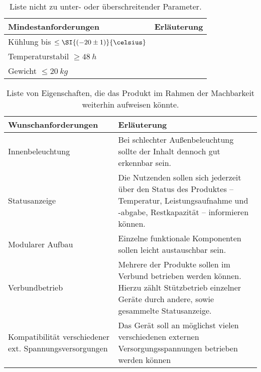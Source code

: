 		\newpage
		\begin{table}[h]
			\centering
			\caption{Liste nicht zu unter- oder überschreitender Parameter.}
			\begin{tabular}{@{}p{.49\textwidth}p{}@{}}
				\toprule
				\textbf{Mindestanforderungen} 					& \textbf{Erläuterung} \\
				\midrule
				Kühlung bis \(\leq \SI{(-20 \pm 1)}{\celsius}\)	& \\
				Temperaturstabil \(\geq \SI{48}{h}\) 			& \\
				Gewicht \(\leq \SI{20}{kg}\)					& \\
				\bottomrule
			\end{tabular}
		\end{table}
		\newpage
		\begin{table}[h]
			\centering
			\caption{Liste von Eigenschaften, die das Produkt im Rahmen der Machbarkeit weiterhin aufweisen könnte.}
			\begin{tabular}{@{}p{}p{}@{}}
				\toprule
				\textbf{Wunschanforderungen} 											& \textbf{Erläuterung} \\
				\midrule
				Innenbeleuchtung 												& Bei schlechter Außenbeleuchtung sollte der Inhalt dennoch gut erkennbar sein.\\
				Statusanzeige													& Die Nutzenden sollen sich jederzeit über den Status des Produktes -- Temperatur,
																				Leistungsaufnahme und -abgabe, Restkapazität -- informieren können.\\
				Modularer Aufbau												& Einzelne funktionale Komponenten sollen leicht austauschbar sein.\\
				Verbundbetrieb													& Mehrere der Produkte sollen im Verbund betrieben werden können. Hierzu zählt Stützbetrieb einzelner Geräte durch andere, sowie
																				gesammelte Statusanzeige.\\
				Kompatibilität verschiedener ext. Spannungsversorgungen 		& Das Gerät soll an möglichst vielen verschiedenen externen Versorgungsspannungen betrieben werden können \\
				\bottomrule
			\end{tabular}
		\end{table}